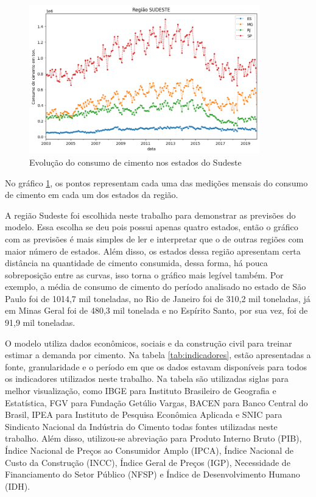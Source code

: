\begin{figure}[H]
    \centering
    \includegraphics[width=10cm]{../figuras/consumo/dado-se.png}
    \caption{Evolução do consumo de cimento nos estados do Sudeste}
    \label{consumo-se}
\end{figure}

No gráfico \ref{consumo-se}, os pontos representam cada uma das
 medições mensais  do consumo de cimento em cada um dos estados
 da região.

A região Sudeste foi escolhida neste trabalho para demonstrar as 
previsões do modelo. Essa escolha se deu pois possui apenas quatro 
estados, então o gráfico com as previsões é mais simples de 
ler e interpretar que o de outras regiões com maior número de estados.
Além disso, os estados dessa região apresentam certa distância
na quantidade de cimento consumida, dessa forma, há pouca sobreposição 
entre as curvas, isso torna o gráfico mais legível também. Por 
exemplo, a média de consumo de cimento do período analisado no 
estado de São Paulo foi de 1014,7 mil toneladas, no Rio de Janeiro
foi de 310,2 mil toneladas, já em Minas Geral foi de 480,3 mil 
tonelada e no Espírito Santo, por sua vez, foi de 91,9 mil toneladas.

O modelo utiliza dados econômicos, sociais e da construção
civil para treinar estimar a demanda por cimento. Na tabela
\ref{tab:indicadores}, estão
apresentadas a fonte, granularidade e o período em que os dados 
estavam disponíveis para todos os indicadores utilizados neste 
trabalho. Na tabela são utilizadas siglas para melhor visualização,
como IBGE para Instituto Brasileiro
de Geografia e Estatística, FGV para Fundação Getúlio Vargas,
BACEN para Banco Central do Brasil, IPEA para Instituto de 
Pesquisa Econômica Aplicada e SNIC para Sindicato Nacional 
da Indústria do Cimento todas fontes utilizadas neste trabalho.
Além disso, utilizou-se abreviação para Produto Interno Bruto (PIB),
Índice Nacional de Preços ao Consumidor Amplo (IPCA),
Índice Nacional de Custo da Construção (INCC), Índice Geral de 
Preços (IGP), Necessidade de Financiamento do Setor Público (NFSP) e 
Índice de Desenvolvimento Humano (IDH).


